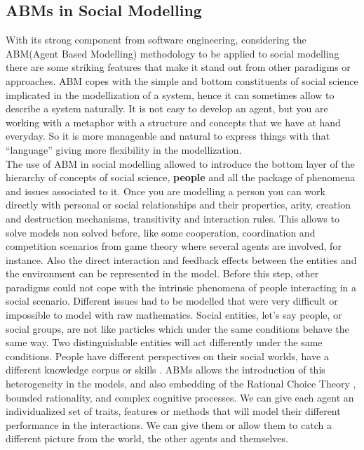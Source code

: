 \documentclass[11pt,oneside,a4paper,openright]{report}
\begin{document}
\subsection{ABMs in Social Modelling}
With its strong component from software engineering, considering the ABM(Agent Based Modelling) methodology to be applied to social modelling there are some striking features that make it stand out from other paradigms or approaches. ABM copes with the simple and bottom constituents of social science implicated in the modellization of a system, hence it can sometimes allow to describe a system naturally. It is not easy to develop an agent, but you are working with a metaphor  with a structure and concepts that we have at hand everyday. So it is more manageable and natural to express things with that “language” giving more flexibility in the modellization.\\ 
The use of ABM in social modelling allowed to introduce the bottom layer of the hierarchy of concepts of social science, \textbf{people} and all the package of phenomena and issues associated to it. Once you are modelling a person you can work directly with personal or social relationships and their properties, arity, creation and destruction mechanisms, transitivity and interaction rules. This allows to solve models non solved before, like some cooperation, coordination and competition scenarios from game theory where several agents are involved, for instance. Also the direct interaction and feedback effects between the entities and the environment can be represented in the model. Before this step, other paradigms could not cope with the intrinsic phenomena of people interacting in a social scenario. Different issues had to be modelled that were very difficult or impossible to model with raw mathematics.
Social entities, let's say people, or social groups, are not like particles which under the same conditions behave the same way. Two distinguishable entities will act differently under the same conditions. People have different perspectives on their social worlds, have a different knowledge corpus or skills \cite[p.19]{GilbertTroitzsch}. ABMs allows the introduction of this heterogeneity in the models, and also embedding of the Rational Choice Theory \cite{Scott2000}, bounded rationality, and complex cognitive processes. We can give each agent an individualized set of traits, features or methods that will model their different performance in the interactions. We can give them or allow them to catch a different picture from the world, the other agents and themselves.\\ 
\end{document}
